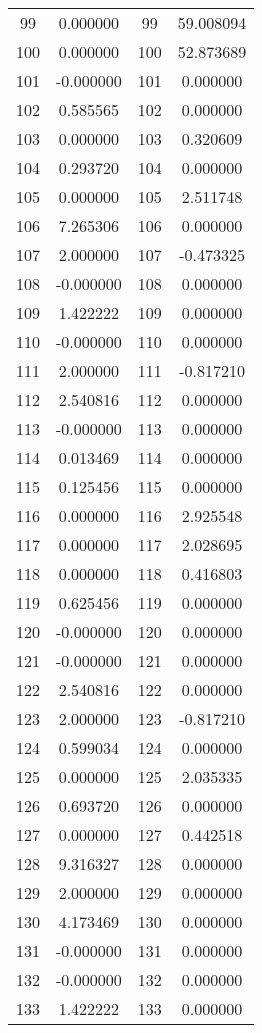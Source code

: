 \documentclass[12pt]{article}
\begin{document}
\begin{longtable}{@{}cccc@{}}
99 & 0.000000 & 99 & 59.008094 \\
100 & 0.000000 & 100 & 52.873689 \\
101 & -0.000000 & 101 & 0.000000 \\
102 & 0.585565 & 102 & 0.000000 \\
103 & 0.000000 & 103 & 0.320609 \\
104 & 0.293720 & 104 & 0.000000 \\
105 & 0.000000 & 105 & 2.511748 \\
106 & 7.265306 & 106 & 0.000000 \\
107 & 2.000000 & 107 & -0.473325 \\
108 & -0.000000 & 108 & 0.000000 \\
109 & 1.422222 & 109 & 0.000000 \\
110 & -0.000000 & 110 & 0.000000 \\
111 & 2.000000 & 111 & -0.817210 \\
112 & 2.540816 & 112 & 0.000000 \\
113 & -0.000000 & 113 & 0.000000 \\
114 & 0.013469 & 114 & 0.000000 \\
115 & 0.125456 & 115 & 0.000000 \\
116 & 0.000000 & 116 & 2.925548 \\
117 & 0.000000 & 117 & 2.028695 \\
118 & 0.000000 & 118 & 0.416803 \\
119 & 0.625456 & 119 & 0.000000 \\
120 & -0.000000 & 120 & 0.000000 \\
121 & -0.000000 & 121 & 0.000000 \\
122 & 2.540816 & 122 & 0.000000 \\
123 & 2.000000 & 123 & -0.817210 \\
124 & 0.599034 & 124 & 0.000000 \\
125 & 0.000000 & 125 & 2.035335 \\
126 & 0.693720 & 126 & 0.000000 \\
127 & 0.000000 & 127 & 0.442518 \\
128 & 9.316327 & 128 & 0.000000 \\
129 & 2.000000 & 129 & 0.000000 \\
130 & 4.173469 & 130 & 0.000000 \\
131 & -0.000000 & 131 & 0.000000 \\
132 & -0.000000 & 132 & 0.000000 \\
133 & 1.422222 & 133 & 0.000000 \\

\end{longtable}
\end{document}
